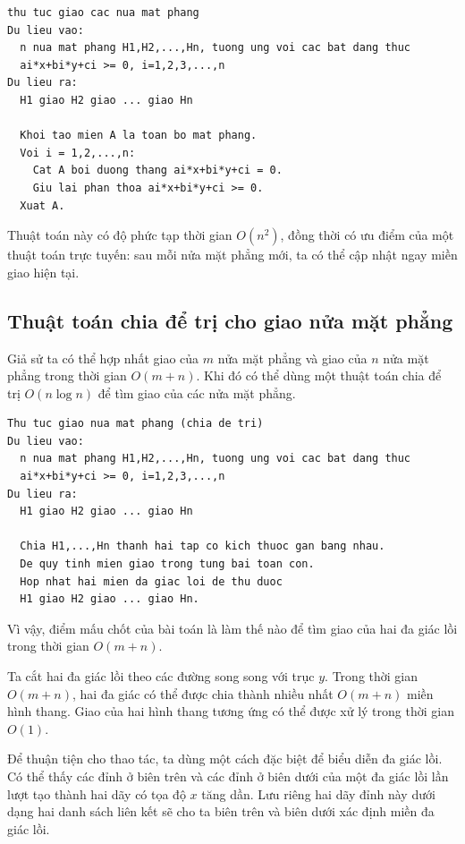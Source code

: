 \documentclass[11pt]{article}
\begin{document}
\begin{verbatim}
thu tuc giao cac nua mat phang
Du lieu vao:
  n nua mat phang H1,H2,...,Hn, tuong ung voi cac bat dang thuc
  ai*x+bi*y+ci >= 0, i=1,2,3,...,n
Du lieu ra:
  H1 giao H2 giao ... giao Hn

  Khoi tao mien A la toan bo mat phang.
  Voi i = 1,2,...,n:
    Cat A boi duong thang ai*x+bi*y+ci = 0.
    Giu lai phan thoa ai*x+bi*y+ci >= 0.
  Xuat A.
\end{verbatim}

Thuật toán này có độ phức tạp thời gian \(O(n^2)\), đồng thời có ưu điểm của
một thuật toán trực tuyến: sau mỗi nửa mặt phẳng mới, ta có thể cập nhật ngay
miền giao hiện tại.

\subsection{Thuật toán chia để trị cho giao nửa mặt phẳng}

Giả sử ta có thể hợp nhất giao của \(m\) nửa mặt phẳng và giao của \(n\) nửa
mặt phẳng trong thời gian \(O(m+n)\). Khi đó có thể dùng một thuật toán chia
để trị \(O(n\log n)\) để tìm giao của các nửa mặt phẳng.

\begin{verbatim}
Thu tuc giao nua mat phang (chia de tri)
Du lieu vao:
  n nua mat phang H1,H2,...,Hn, tuong ung voi cac bat dang thuc
  ai*x+bi*y+ci >= 0, i=1,2,3,...,n
Du lieu ra:
  H1 giao H2 giao ... giao Hn

  Chia H1,...,Hn thanh hai tap co kich thuoc gan bang nhau.
  De quy tinh mien giao trong tung bai toan con.
  Hop nhat hai mien da giac loi de thu duoc
  H1 giao H2 giao ... giao Hn.
\end{verbatim}

Vì vậy, điểm mấu chốt của bài toán là làm thế nào để tìm giao của hai đa giác
lồi trong thời gian \(O(m+n)\).

Ta cắt hai đa giác lồi theo các đường song song với trục \(y\). Trong thời
gian \(O(m+n)\), hai đa giác có thể được chia thành nhiều nhất \(O(m+n)\)
miền hình thang. Giao của hai hình thang tương ứng có thể được xử lý trong
thời gian \(O(1)\).

Để thuận tiện cho thao tác, ta dùng một cách đặc biệt để biểu diễn đa giác
lồi. Có thể thấy các đỉnh ở biên trên và các đỉnh ở biên dưới của một đa
giác lồi lần lượt tạo thành hai dãy có tọa độ \(x\) tăng dần. Lưu riêng hai
dãy đỉnh này dưới dạng hai danh sách liên kết sẽ cho ta biên trên và biên
dưới xác định miền đa giác lồi.
\end{document}
